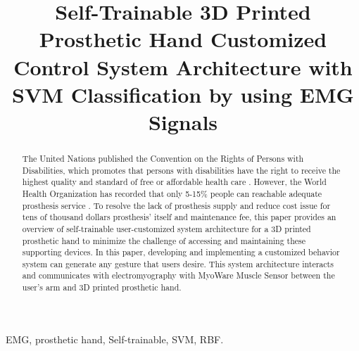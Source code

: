 \documentclass[conference]{IEEEtran}
\begin{document}
\title{Self-Trainable 3D Printed Prosthetic Hand Customized Control System Architecture with SVM Classification by using EMG Signals}

\author{
\and
{}
}


\maketitle

\begin{abstract}
The United Nations published the Convention on the Rights of Persons with Disabilities, which promotes that persons with disabilities have the right to receive the highest quality and standard of free or affordable health care \cite{UN}. However, the World Health Organization has recorded that only 5-15\% people can reachable adequate prosthesis service \cite{WHO}. To resolve the lack of prosthesis supply and reduce cost issue for tens of thousand dollars prosthesis' itself and maintenance fee, this paper provides an overview of self-trainable user-customized system architecture for a 3D printed prosthetic hand to minimize the challenge of accessing and maintaining these supporting devices. In this paper, developing and implementing a customized behavior system can generate any gesture that users desire. This system architecture interacts and communicates with electromyography with MyoWare Muscle Sensor between the user's arm and 3D printed prosthetic hand.
\end{abstract}

\begin{IEEEkeywords}
EMG, prosthetic hand, Self-trainable, SVM, RBF.
\end{IEEEkeywords}


\IEEEpeerreviewmaketitle


\end{document}
